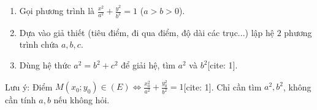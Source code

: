 \begin{enumerate}
\item Gọi phương trình là $\frac{x^2}{a^2} + \frac{y^2}{b^2} = 1$ ($a > b > 0$).
\item Dựa vào giả thiết (tiêu điểm, đi qua điểm, độ dài các trục...) lập hệ $2$ phương trình chứa $a, b, c$.
\item Dùng hệ thức $a^2 = b^2 + c^2$ để giải hệ, tìm $a^2$ và $b^2$[cite: 1].
\end{enumerate}
Lưu ý: Điểm $M(x_0; y_0) \in (E) \Leftrightarrow \frac{x_0^2}{a^2} + \frac{y_0^2}{b^2} = 1$[cite: 1]. Chỉ cần tìm $a^2, b^2$, không cần tính $a, b$ nếu không hỏi.
